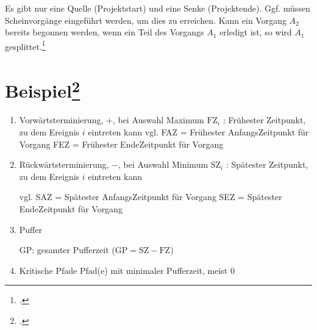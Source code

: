 \documentclass{lehramt-informatik}
\begin{document}
\begin{center}
\end{center}

Es gibt nur eine Quelle (Projektstart) und eine Senke (Projektende).
Ggf. müssen Scheinvorgänge eingeführt werden, um dies zu erreichen.
%
Kann ein Vorgang $A_2$ bereits begonnen werden, wenn ein Teil des
Vorgangs $A_1$ erledigt ist, so wird $A_1$ gesplittet.\footcite[Seite
27]{sosy:fs:3}

\section{Beispiel\footcite[Seite 16 - 21]{sosy:fs:3}}

\begin{center}
\end{center}

\begin{enumerate}

%

\item  Vorwärtsterminierung, $+$, bei Auswahl Maximum
$\text{FZ}_i$ : Frühester Zeitpunkt, zu dem Ereignis $i$ eintreten kann
vgl. FAZ = Frühester AnfangsZeitpunkt für Vorgang
FEZ = Frühester EndeZeitpunkt für Vorgang

%

\item Rückwärtsterminierung, $-$, bei Auswahl Minimum
$\text{SZ}_i$ : Spätester Zeitpunkt, zu dem Ereignis $i$ eintreten kann

vgl. SAZ = Spätester AnfangsZeitpunkt für Vorgang
SEZ = Spätester EndeZeitpunkt für Vorgang

%

\item Puffer

GP: gesamter Pufferzeit ($\text{GP} = \text{SZ} - \text{FZ}$)

%

\item Kritische Pfade
Pfad(e) mit minimaler Pufferzeit, meist $0$

\end{enumerate}
\end{document}
